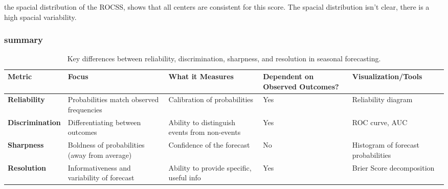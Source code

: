 the spacial distribution of the ROCSS, shows that all centers are consistent for this score. The spacial distribution isn't clear, there is a high spacial variability.



\subsubsection{summary}
\begin{table}[h!]
\centering
\begin{tabularx}{\textwidth}{@{}p{2.5cm}p{4cm}p{4cm}p{2.5cm}p{3cm}@{}}
\toprule
\textbf{Metric}       & \textbf{Focus}                                    & \textbf{What it Measures}                         & \textbf{Dependent on Observed Outcomes?} & \textbf{Visualization/Tools}             \\ \midrule
\textbf{Reliability}   & Probabilities match observed frequencies          & Calibration of probabilities                      & Yes                                      & Reliability diagram                      \\
\textbf{Discrimination} & Differentiating between outcomes                 & Ability to distinguish events from non-events    & Yes                                      & ROC curve, AUC                           \\
\textbf{Sharpness}     & Boldness of probabilities (away from average)     & Confidence of the forecast                        & No                                       & Histogram of forecast probabilities      \\
\textbf{Resolution}    & Informativeness and variability of forecast       & Ability to provide specific, useful info         & Yes                                      & Brier Score decomposition                \\ \bottomrule
\end{tabularx}
\caption{Key differences between reliability, discrimination, sharpness, and resolution in seasonal forecasting.}
\label{tab:forecast_metrics}
\end{table}

\newpage
\thispagestyle{empty}
\mbox{}

\endinput